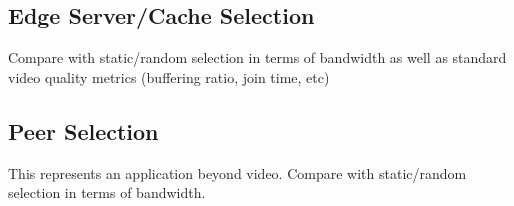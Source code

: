 \documentclass[10pt,twocolumn]{article}
\begin{document}
\subsection{Edge Server/Cache Selection}
Compare with static/random selection in terms of bandwidth as well as standard video quality metrics (buffering ratio, join time, etc)


\subsection{Peer Selection}
This represents an application beyond video. Compare with static/random selection in terms of bandwidth.

{\scriptsize


}


%
\end{document}
